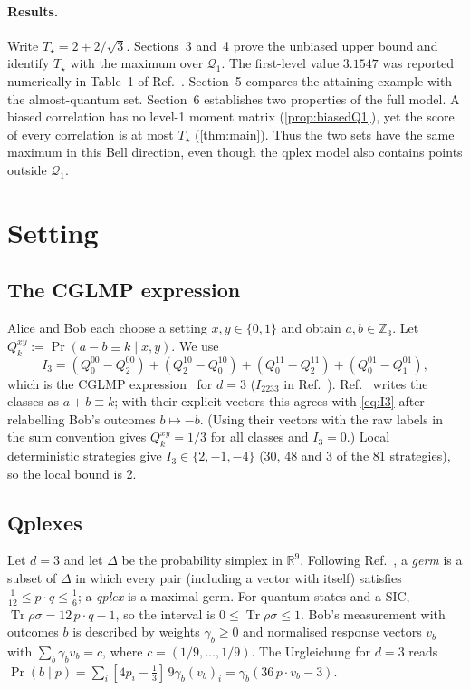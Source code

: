 \documentclass[11pt]{article}
\theoremstyle{definition}
\newcommand{\Tq}{T_{\star}}
\newcommand{\tr}{\operatorname{Tr}}
\newcommand{\qone}{\mathcal{Q}_1}
\begin{document}
\paragraph{Results.}
Write $\Tq=2+2/\sqrt3$. Sections~3 and~4 prove the unbiased upper bound and identify
$\Tq$ with the maximum over $\qone$. The first-level value $3.1547$ was reported numerically
in Table~1 of Ref.~\cite{NPA2008}. Section~5 compares the attaining example with the almost-quantum set.
Section~6 establishes two properties of the full model. A biased correlation has no
level-1 moment matrix (\cref{prop:biasedQ1}), yet the score of every correlation is at most
$\Tq$ (\cref{thm:main}). Thus the two sets have the same maximum in this Bell direction,
even though the qplex model also contains points outside $\qone$.

\section{Setting}

\subsection{The CGLMP expression}
Alice and Bob each choose a setting $x,y\in\{0,1\}$ and obtain $a,b\in\mathbb{Z}_3$. Let
$Q^{xy}_k := \Pr(a-b\equiv k\mid x,y)$. We use
\begin{equation}\label{eq:I3}
I_3 = (Q^{00}_0-Q^{00}_2) + (Q^{10}_2-Q^{10}_0) + (Q^{11}_0-Q^{11}_2) + (Q^{01}_0-Q^{01}_1),
\end{equation}
which is the CGLMP expression~\cite{CGLMP2002} for $d=3$ ($I_{2233}$ in Ref.~\cite{GuptaPienaar2026}).
Ref.~\cite{GuptaPienaar2026} writes the classes as $a+b\equiv k$; with their explicit vectors this agrees with
\eqref{eq:I3} after relabelling Bob's outcomes $b\mapsto -b$. (Using their vectors with the raw labels in the sum
convention gives $Q^{xy}_k=1/3$ for all classes and $I_3=0$.) Local deterministic strategies give
$I_3\in\{2,-1,-4\}$ (30, 48 and 3 of the 81 strategies), so the local bound is 2.

\subsection{Qplexes}
Let $d=3$ and let $\Delta$ be the probability simplex in $\mathbb{R}^9$. Following Ref.~\cite{Qplex2017},
a \emph{germ} is a subset of $\Delta$ in which every pair (including a vector with itself) satisfies
$\tfrac1{12}\le p\cdot q\le\tfrac16$; a \emph{qplex} is a maximal germ. For quantum states and a SIC,
$\tr\rho\sigma = 12\,p\cdot q-1$, so the interval is $0\le\tr\rho\sigma\le1$. Bob's measurement with outcomes
$b$ is described by weights $\gamma_b\ge0$ and normalised response vectors $v_b$ with $\sum_b\gamma_b v_b=c$,
where $c=(1/9,\dots,1/9)$. The Urgleichung for $d=3$ reads
$\Pr(b\mid p) = \sum_i [4p_i-\tfrac13]\, 9\gamma_b (v_b)_i = \gamma_b(36\,p\cdot v_b-3)$.
\end{document}
